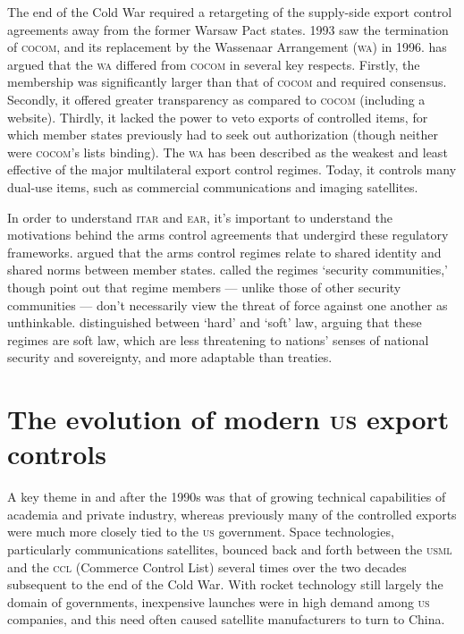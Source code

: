 \documentclass[preprint,twocolumn,5p]{elsarticle}
\begin{document}
The end of the Cold War required a retargeting of the supply-side export control agreements away from the former Warsaw Pact states. 1993 saw the termination of \textsc{cocom}, and its replacement by the Wassenaar Arrangement (\textsc{wa}) in 1996. \citet{Lipson1999} has argued that the \textsc{wa} differed from \textsc{cocom} in several key respects. Firstly, the membership was significantly larger than that of \textsc{cocom} and required consensus. Secondly, it offered greater transparency as compared to \textsc{cocom} (including a website). Thirdly, it lacked the power to veto exports of controlled items, for which member states previously had to seek out authorization (though neither were \textsc{cocom}'s lists binding). The \textsc{wa} has been described as the weakest and least effective of the major multilateral export control regimes. Today, it controls many dual-use items, such as commercial communications and imaging satellites.

In order to understand \textsc{itar} and \textsc{ear}, it's important to understand the motivations behind the arms control agreements that undergird these regulatory frameworks. \citet{Lipson1999} argued that the arms control regimes relate to shared identity and shared norms between member states. \citet{Joyner2004} called the regimes `security communities,' though \citet{Beck2019} point out that regime members --- unlike those of other security communities --- don't necessarily view the threat of force against one another as unthinkable. \citet{Abbott2000} distinguished between `hard' and `soft' law, arguing that these regimes are soft law, which are less threatening to nations' senses of national security and sovereignty, and more adaptable than treaties.

\section{The evolution of modern {\scshape us} export controls}
A key theme in and after the 1990s was that of growing technical capabilities of academia and private industry, whereas previously many of the controlled exports were much more closely tied to the \textsc{us} government. Space technologies, particularly communications satellites, bounced back and forth between the \textsc{usml} and the \textsc{ccl} (Commerce Control List) several times over the two decades subsequent to the end of the Cold War. With rocket technology still largely the domain of governments, inexpensive launches were in high demand among \textsc{us} companies, and this need often caused satellite manufacturers to turn to China.
\end{document}

